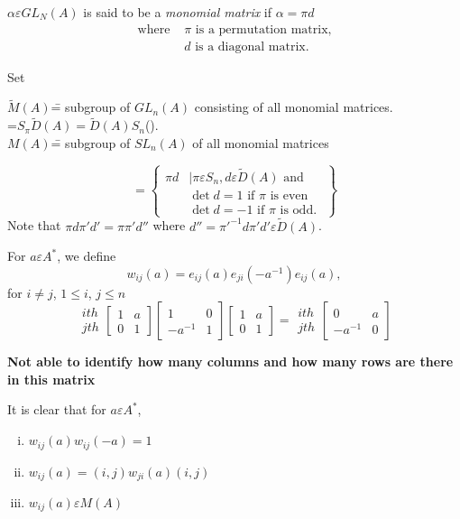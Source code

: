 \begin{dfn}\label{c3:dfn2.1}
$\alpha \varepsilon GL_N(A)$ is said to be a \textit{monomial matrix}
  if $\alpha=\pi d$
$$
\begin{aligned}
\text{ where } &\pi \text{ is a permutation matrix, }\\
&{}d \text{ is a diagonal matrix. }
\end{aligned}
$$

Set
\begin{tabbing}
$\tilde{M}(A)$\= = subgroup of $GL_n(A)$ consisting of all monomial
  matrices.\\[5pt]
\>=$S_{\pi}\tilde{D}(A)=\tilde{D}(A)S_n$\quad(). \\[5pt]
$M(A)$\= = subgroup of $SL_n(A)$ of all monomial matrices
\end{tabbing}
$$
=
\left\{\begin{aligned}
\pi d &\mid \pi \varepsilon S_n, d\varepsilon \tilde{D}(A) \text{ and }\\
&\det d=1 \text{ if } \pi \text{ is even }\\
&{} \det d= -1 \text{ if } \pi \text{ is odd. }
\end{aligned}\right\}
$$
Note that $\pi d\pi' d'=\pi\pi' d''$ where
$d''=\pi'^{-1}d\pi'd'\varepsilon \tilde{D}(A)$.

For $a\varepsilon A^{\ast}$, we define
$$
w_{ij}(a)=e_{ij}(a)e_{ji}\left(-a^{-1}\right)e_{ij}(a),
$$
for $i\neq j$, $1\leq i$, $j\leq n$
$$
\begin{matrix}
ith\\
jth
\end{matrix} 
\begin{bmatrix}
1 & a\\
0 & 1
\end{bmatrix}\begin{bmatrix}
1 & 0\\
-a^{-1} & 1
\end{bmatrix} \begin{bmatrix}
1 & a\\
0 & 1
\end{bmatrix} = \begin{matrix}
ith\\
jth
\end{matrix} \begin{bmatrix}
0 & a\\
-a^{-1} & 0
\end{bmatrix}
$$

{\large\bf Not able to identify how many columns and how many rows are
there in this matrix}


It is clear that for $a\varepsilon A^{\ast}$, 
\begin{enumerate}[(i)]
\item $w_{ij}(a)w_{ij}(-a)=1$
\item $w_{ij}(a)=(i,j)w_{ji}(a)(i,j)$
\item $w_{ij}(a)\varepsilon M(A)$
\end{enumerate}
\end{dfn}

